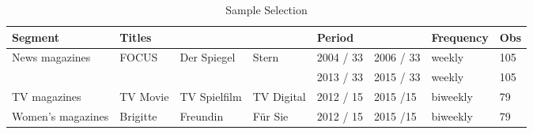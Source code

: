 \begin{table}[ht]\centering
	\caption{Sample Selection}
\begin{adjustbox}{width=\textwidth}	
\begin{tabular}{llllllll}
\hline 
	 Segment 	& Titles & & & Period &  & Frequency & Obs \\ \hline
	News magazines 		& FOCUS & Der Spiegel & Stern & 2004 / 33 & 2006 / 33 & weekly & 105 \\
	 &  &  &  & 2013 / 33 & 2015 / 33 & weekly & 105 \\ \hline
	TV magazines 			& TV Movie & TV Spielfilm & TV Digital & 2012 / 15 & 2015 /15 & biweekly & 79 \\ \hline
	Women's magazines	& Brigitte & Freundin & Für Sie & 2012 / 15 & 2015 /15 & biweekly & 79 \\ \hline
\end{tabular}
	\label{tab:sample selection}
\end{adjustbox}
\end{table}